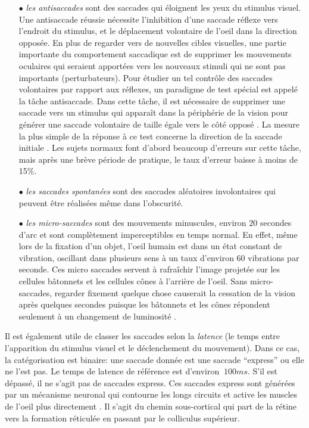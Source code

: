 \begin{itemize}
\item[$\bullet$]{\em les antisaccades} sont des saccades qui éloignent les yeux du stimulus visuel. Une antisaccade réussie nécessite l'inhibition d'une saccade réflexe vers l'endroit du stimulus, et le déplacement volontaire de l'oeil dans la direction opposée. En plus de regarder vers de nouvelles cibles visuelles, une partie importante du comportement saccadique est de supprimer les mouvements oculaires qui seraient apportées vers les nouveaux stimuli qui ne sont pas importants (perturbateurs). Pour étudier un tel contrôle des saccades volontaires par rapport aux réflexes, un paradigme de test spécial est appelé la tâche antisaccade. 
Dans cette tâche, il est nécessaire de supprimer une saccade vers un stimulus qui apparaît dans la périphérie de la vision pour générer une saccade volontaire de taille égale vers le côté opposé \cite{Fischer:1997}. La mesure la plus simple de la réponse à ce test concerne la direction de la saccade initiale \cite{Currie:1991}. Les sujets normaux font d'abord beaucoup d'erreurs sur cette tâche, mais après une brève période de pratique, le taux d'erreur baisse à moins de 15\%.\\

\item[$\bullet$]{\em les saccades spontanées} sont des saccades aléatoires involontaires qui peuvent être réalisées même dans l'obscurité.\\

\item[$\bullet$]{\em les micro-saccades} sont des mouvements minuscules, environ $20$ secondes d'arc et sont complètement imperceptibles en temps normal. En effet, même lors de la fixation d'un objet, l'oeil humain est dans un état constant de vibration, oscillant dans plusieurs sens à un taux d'environ $60$ vibrations par seconde. Ces micro saccades servent à rafraîchir l'image  projetée sur les cellules bâtonnets et les cellules cônes à l'arrière de l'oeil. Sans micro-saccades, regarder fixement quelque chose causerait la cessation de la vision après quelques secondes puisque les bâtonnets et les cônes répondent seulement à un changement de luminosité \cite{Pettigrew:1990}.\\

\end{itemize}

Il est également utile de classer les saccades selon la \textit{latence} (le temps entre l'apparition du stimulus visuel et le déclenchement du mouvement). Dans ce cas, la catégorisation est binaire: une saccade donnée est une saccade ``express'' ou elle ne l'est pas. Le temps de latence de référence est d'environ $~100 ms$. S'il est dépassé, il ne s'agit pas de saccades express. Ces saccades express sont générées par un mécanisme neuronal qui contourne les longs circuits et active les muscles de l'oeil plus directement \cite{Fischer:1983}. Il s'agit du chemin sous-cortical qui part de la rétine vers la formation réticulée en passant par le colliculus supérieur.\\

